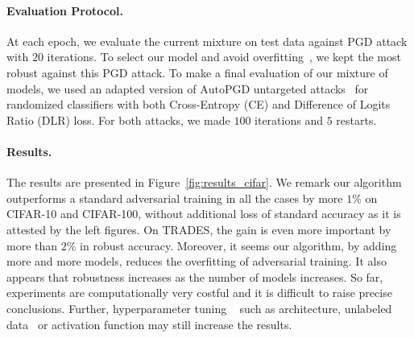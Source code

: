 \paragraph{Evaluation Protocol.} At each epoch, we evaluate the current mixture on test data against PGD attack  with $20$ iterations. To select our model and avoid overfitting~\citep{rice2020overfitting}, we kept the most robust against this PGD attack.
To make a final evaluation of our mixture of models, we used an adapted version of $\textrm{AutoPGD}$ untargeted attacks~\citep{croce2020reliable} for randomized classifiers with both Cross-Entropy (CE) and Difference of Logits Ratio (DLR) loss. For both attacks, we made $100$ iterations and $5$ restarts.

\paragraph{Results.} The results are presented in Figure~\ref{fig:results_cifar}. We remark our algorithm outperforms a standard adversarial training in all the cases by more $1\%$ on CIFAR-10 and CIFAR-100, without additional loss of standard accuracy as it is attested by the left figures. On TRADES, the gain is even more important by more than $2\%$ in robust accuracy. Moreover, it seems our algorithm, by adding more and more models, reduces the overfitting of adversarial training. It also appears that robustness increases as the number of models increases. So far, experiments are computationally very costful and it is difficult to raise precise conclusions. Further, hyperparameter tuning ~\citep{gowal2020uncovering} such as architecture, unlabeled data~\citep{carmon2019unlabeled} or activation function may still increase the results.









